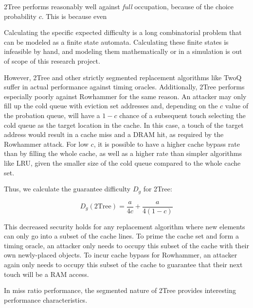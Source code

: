 \documentclass[letterpaper]{article}
\begin{document}

2Tree performs reasonably well against \textit{full} occupation,
because of the choice probability $c$.
This is because even 

Calculating the specific expected difficulty is a long combinatorial problem
that can be modeled as a finite state automata.
Calculating these finite states is infeasible by hand,
and modeling them mathematically or in a simulation is out of scope of this research project.

However, 2Tree and other strictly segmented replacement algorithms like TwoQ
suffer in actual performance against timing oracles.
Additionally, 2Tree performs especially poorly against Rowhammer for the same reason.
An attacker may only fill up the cold queue with eviction set addresses
and, depending on the $c$ value of the probation queue, will have a
$1 - c$ chance of a subsequent touch selecting the cold queue as the target location
in the cache.
In this case, a touch of the target address would result in a cache miss and a DRAM hit,
as required by the Rowhammer attack.
For low $c$, it is possible to have a higher cache bypass rate than by filling the whole cache,
as well as a higher rate than simpler algorithms like LRU, given the smaller size of the
cold queue compared to the whole cache set.

Thus, we calculate the guarantee difficulty $D_g$ for 2Tree:

\begin{equation}
	D_g(\text{2Tree}) = \frac{a}{4c} + \frac{a}{4(1-c)}
	\label{eq:2treegd}
\end{equation}

This decreased security holds for any replacement algorithm where new elements can only go
into a subset of the cache lines.
To prime the cache set and form a timing oracle,
an attacker only needs to occupy this subset of the cache with their own newly-placed objects.
To incur cache bypass for Rowhammer, an attacker again only needs to occupy this subset
of the cache to guarantee that their next touch will be a RAM access.

In miss ratio performance, the segmented nature of 2Tree provides interesting performance characteristics.
\end{document}
